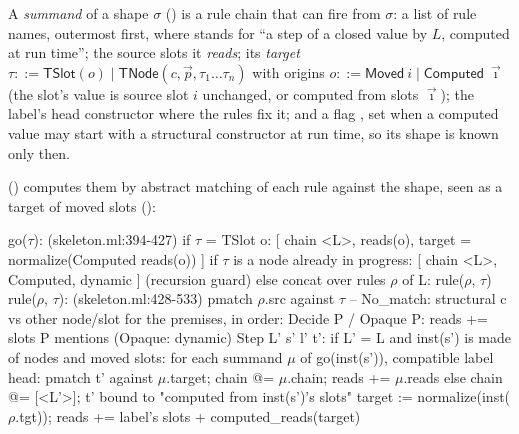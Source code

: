 \begin{definition}
A \emph{summand} of a shape $\sigma$ ()
is a rule chain that can fire from $\sigma$: a list of rule names,
outermost first, where  stands for ``a step of a closed value by
$L$, computed at run time''; the source slots it \emph{reads}; its
\emph{target} $\tau ::= \mathsf{TSlot}(o) \mid \mathsf{TNode}(c,\vec
p,\tau_1\dots\tau_n)$ with origins $o ::= \mathsf{Moved}\ i \mid
\mathsf{Computed}\ \vec \imath$ (the slot's value is source slot $i$
unchanged, or computed from slots $\vec\imath$); the label's head
constructor where the rules fix it; and a flag , set when a
computed value may start with a structural constructor at run time, so
its shape is known only then.
\end{definition}

 () computes them
by abstract matching of each rule against the shape, seen as a target of
moved slots ():

\begin{shell}[mathescape=true]
go($\tau$):                                            (skeleton.ml:394-427)
  if $\tau$ = TSlot o:  [ chain <L>, reads(o), target = normalize(Computed reads(o)) ]
  if $\tau$ is a node already in progress:  [ chain <L>, Computed, dynamic ]   (recursion guard)
  else  concat over rules $\rho$ of L: rule($\rho$, $\tau$)
rule($\rho$, $\tau$):                                       (skeleton.ml:428-533)
  pmatch $\rho$.src against $\tau$          -- No_match: structural c vs other node/slot
  for the premises, in order:
    Decide P / Opaque P:  reads += slots P mentions   (Opaque: dynamic)
    Step L' s' l' t':
      if L' = L and inst(s') is made of nodes and moved slots:
        for each summand $\mu$ of go(inst(s')), compatible label head:
          pmatch t' against $\mu$.target; chain @= $\mu$.chain; reads += $\mu$.reads
      else  chain @= [<L'>]; t' bound to "computed from inst(s')'s slots"
  target := normalize(inst($\rho$.tgt));  reads += label's slots + computed_reads(target)
\end{shell}

